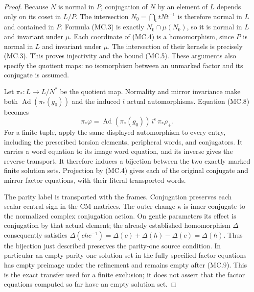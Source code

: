 \begin{proof}
Because $N$ is normal in $P$, conjugation of $N$ by an element of
$L$ depends only on its coset in $L/P$.  The intersection
$N_0=\bigcap_t tNt^{-1}$ is therefore normal in $L$ and contained
in $P$.  Formula (MC.3) is exactly $N_0\cap\mu(N_0)$, so it is
normal in $L$ and invariant under $\mu$.  Each coordinate of (MC.4)
is a homomorphism, since $P$ is normal in $L$ and invariant under
$\mu$.  The intersection of their kernels is precisely (MC.3).
This proves injectivity and the bound (MC.5).  These arguments
also specify the quotient maps: no isomorphism between an unmarked
factor and its conjugate is assumed.

Let $\pi_*:L\to L/N^*$ be the quotient map.  Normality and mirror
invariance make both $\operatorname{Ad}(\pi_*(g_0))$ and the induced
$\overline\iota$ actual automorphisms.  Equation (MC.8) becomes
\[
 \pi_*\varphi=
 \operatorname{Ad}(\pi_*(g_0))\,
 \overline\iota^{\epsilon}\,\pi_*\rho_+.               \tag{MC.9}
\]
For a finite tuple, apply the same displayed automorphism to every
entry, including the prescribed torsion elements, peripheral words,
and conjugators.  It carries a word equation to its image word
equation, and its inverse gives the reverse transport.  It therefore
induces a bijection between the two exactly marked finite solution
sets.  Projection by (MC.4) gives each of the original conjugate
and mirror factor equations, with their literal transported words.

The parity label is transported with the frames.  Conjugation
preserves each scalar central sign in the CM matrices.  The outer
change $\kappa$ is inner-conjugate to the normalized complex
conjugation action.  On gentle parameters its effect is conjugation
by that actual element; the already established homomorphism
$\Delta$ consequently satisfies
$\Delta(c h c^{-1})=\Delta(c)+\Delta(h)-\Delta(c)=\Delta(h)$.
Thus the bijection just described preserves the parity-one source
condition.  In particular an empty parity-one solution set in the
fully specified factor equations has empty preimage under the
refinement and remains empty after (MC.9).  This is the exact
transfer used for a finite exclusion; it does not assert that the
factor equations computed so far have an empty solution set.
\end{proof}
